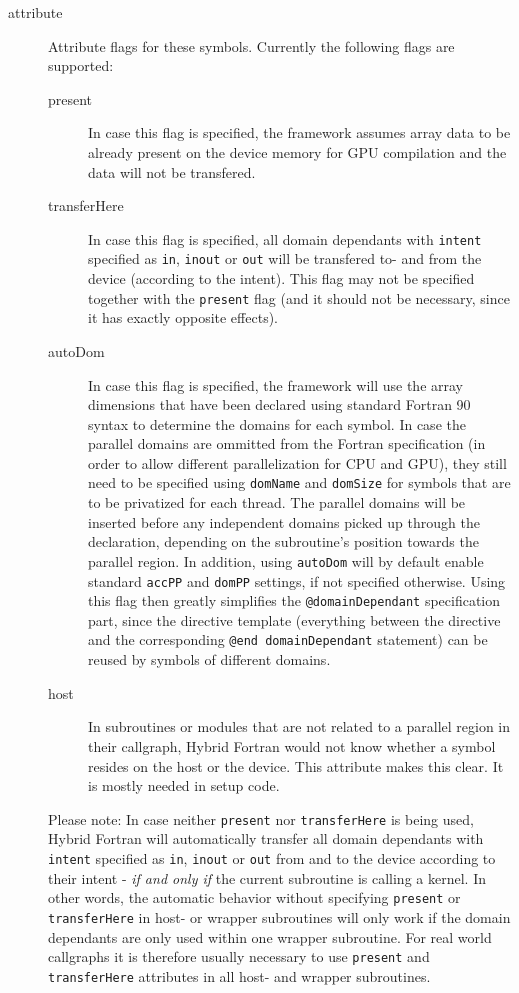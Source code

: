 \begin{description}
 \item [attribute] Attribute flags for these symbols. Currently the following flags are supported:
  \begin{description}
   \item [present] In case this flag is specified, the framework assumes array data to be already present on the device memory for GPU compilation and the data will not be transfered.
   \item [transferHere] In case this flag is specified, all domain dependants with \verb|intent| specified as \verb|in|, \verb|inout| or \verb|out| will be transfered to- and from the device (according to the intent). This flag may not be specified together with the \verb|present| flag (and it should not be necessary, since it has exactly opposite effects).
   \item [autoDom] In case this flag is specified, the framework will use the array dimensions that have been declared using standard Fortran 90 syntax to determine the domains for each symbol. In case the parallel domains are ommitted from the Fortran specification (in order to allow different parallelization for CPU and GPU), they still need to be specified using \verb|domName| and \verb|domSize| for symbols that are to be privatized for each thread. The parallel domains will be inserted before any independent domains picked up through the declaration, depending on the subroutine's position towards the parallel region. In addition, using \verb|autoDom| will by default enable standard \verb|accPP| and \verb|domPP| settings, if not specified otherwise. Using this flag then greatly simplifies the \verb|@domainDependant| specification part, since the directive template (everything between the directive and the corresponding \verb|@end domainDependant| statement) can be reused by symbols of different domains.
   \item [host] In subroutines or modules that are not related to a parallel region in their callgraph, Hybrid Fortran would not know whether a symbol resides on the host or the device. This attribute makes this clear. It is mostly needed in setup code.
  \end{description}
  Please note: In case neither \verb|present| nor \verb|transferHere| is being used, Hybrid Fortran will automatically transfer all domain dependants with \verb|intent| specified as \verb|in|, \verb|inout| or \verb|out| from and to the device according to their intent - \textit{if and only if} the current subroutine is calling a kernel. In other words, the automatic behavior without specifying \verb|present| or \verb|transferHere| in host- or wrapper subroutines will only work if the domain dependants are only used within one wrapper subroutine. For real world callgraphs it is therefore usually necessary to use \verb|present| and \verb|transferHere| attributes in all host- and wrapper subroutines.
\end{description}

